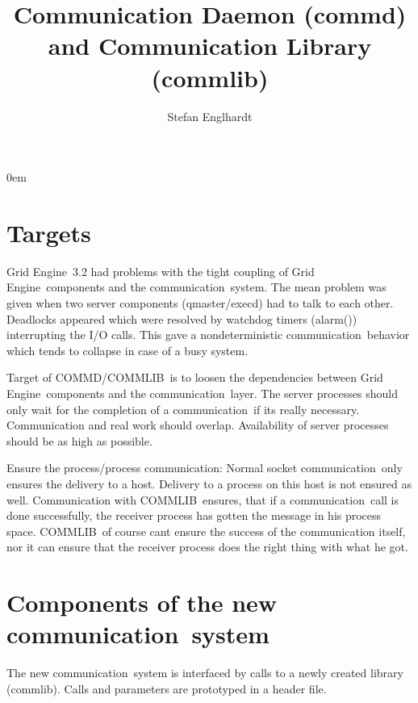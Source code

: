 
\newcommand{\C}    {Grid Engine}
\newcommand{\CD}   {COMMD}
\newcommand{\cd}   {commd}
\newcommand{\CL}   {COMMLIB}
\newcommand{\cl}   {commlib}
\newcommand{\co}   {communication}

\title{Communication Daemon (\cd) and Communication Library (\cl)}

\author{Stefan Englhardt}

\frenchspacing
\sloppy
\parindent 0em


\maketitle

\section{Targets}

\C\ 3.2 had problems with the tight coupling of \C\ components and 
the \co\ system. The mean problem was given when two server components 
(qmaster/execd) had to talk to each other. Deadlocks appeared which were
resolved by watchdog timers (alarm()) interrupting the I/O calls. This 
gave a nondeterministic \co\ behavior which tends to collapse in 
case of a busy system. 


Target of \CD/\CL\ is to loosen the dependencies between \C\ components and 
the \co\ layer. The server processes should only wait for the  
completion of a \co\ if its really necessary. Communication and real work 
should overlap. Availability of server processes should be as high as 
possible.


Ensure the process/process \co:
Normal socket \co\ only ensures the delivery to a host. Delivery to
a process on this host is not ensured as well. Communication with
\CL\ ensures, that if a \co\ call is done successfully, the receiver 
process has gotten the message in his process space. \CL\ of course cant
ensure the success of the communication itself, nor it can ensure that 
the receiver process does the right thing with what he got.


\section{Components of the new \co\ system}
The new \co\ system is interfaced by calls to a newly created library 
(commlib). Calls and parameters are prototyped in a header file.

